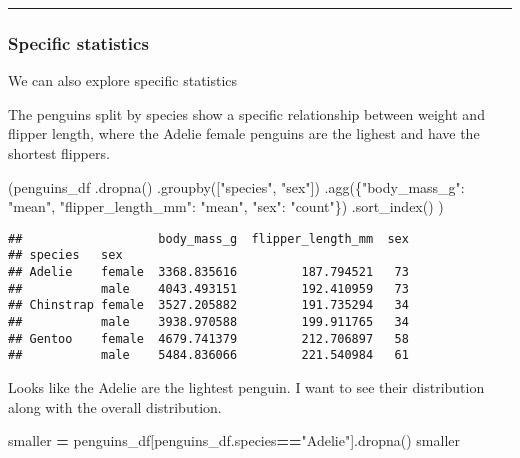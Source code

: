 \documentclass[
]{article}
\newenvironment{Shaded}{\begin{snugshade}}{\end{snugshade}}
\newcommand{\NormalTok}[1]{#1}
\newcommand{\OperatorTok}[1]{\textcolor[rgb]{0.81,0.36,0.00}{\textbf{#1}}}
\newcommand{\StringTok}[1]{\textcolor[rgb]{0.31,0.60,0.02}{#1}}
\begin{document}
\begin{center}\rule{0.5\linewidth}{0.5pt}\end{center}

\hypertarget{specific-statistics}{%
\subsubsection{Specific statistics}\label{specific-statistics}}

We can also explore specific statistics

The penguins split by species show a specific relationship between
weight and flipper length, where the Adelie female penguins are the
lighest and have the shortest flippers.

\begin{Shaded}
\begin{Highlighting}[]
\NormalTok{(penguins\_df}
\NormalTok{.dropna()}
\NormalTok{.groupby([}\StringTok{"species"}\NormalTok{, }\StringTok{"sex"}\NormalTok{])}
\NormalTok{.agg(\{}\StringTok{"body\_mass\_g"}\NormalTok{: }\StringTok{"mean"}\NormalTok{, }\StringTok{"flipper\_length\_mm"}\NormalTok{: }\StringTok{"mean"}\NormalTok{, }\StringTok{"sex"}\NormalTok{: }\StringTok{"count"}\NormalTok{\})}
\NormalTok{.sort\_index()}
\NormalTok{)}
\end{Highlighting}
\end{Shaded}

\begin{verbatim}
##                   body_mass_g  flipper_length_mm  sex
## species   sex                                        
## Adelie    female  3368.835616         187.794521   73
##           male    4043.493151         192.410959   73
## Chinstrap female  3527.205882         191.735294   34
##           male    3938.970588         199.911765   34
## Gentoo    female  4679.741379         212.706897   58
##           male    5484.836066         221.540984   61
\end{verbatim}

Looks like the Adelie are the lightest penguin. I want to see their
distribution along with the overall distribution.

\begin{Shaded}
\begin{Highlighting}[]
\NormalTok{smaller }\OperatorTok{=}\NormalTok{ penguins\_df[penguins\_df.species}\OperatorTok{==}\StringTok{"Adelie"}\NormalTok{].dropna()}
\NormalTok{smaller}
\end{Highlighting}
\end{Shaded}
\end{document}
